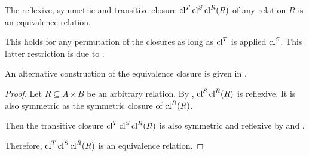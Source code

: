 \begin{proposition}\label{thm:equivalence_closure}
  The \hyperref[def:relation_closures/reflexive]{reflexive}, \hyperref[def:relation_closures/symmetric]{symmetric} and \hyperref[def:relation_closures/transitive]{transitive} closure \( \operatorname{cl}^T \operatorname{cl}^S \operatorname{cl}^R (R) \) of any relation \( R \) is an \hyperref[def:equivalence_relation]{equivalence relation}.
\end{proposition}
\begin{comments}
  \item This holds for any permutation of the closures as long as \( \operatorname{cl}^T \) is applied  \( \operatorname{cl}^S \). This latter restriction is due to .
  \item An alternative construction of the equivalence closure is given in .
\end{comments}
\begin{proof}
  Let \( R \subseteq A \times B \) be an arbitrary relation. By , \( \operatorname{cl}^S \operatorname{cl}^R (R) \) is reflexive. It is also symmetric as the symmetric closure of \( \operatorname{cl}^R(R) \).

  Then the transitive closure \( \operatorname{cl}^T \operatorname{cl}^S \operatorname{cl}^R (R) \) is also symmetric and reflexive by  and .

  Therefore, \( \operatorname{cl}^T \operatorname{cl}^S \operatorname{cl}^R (R) \) is an equivalence relation.
\end{proof}
